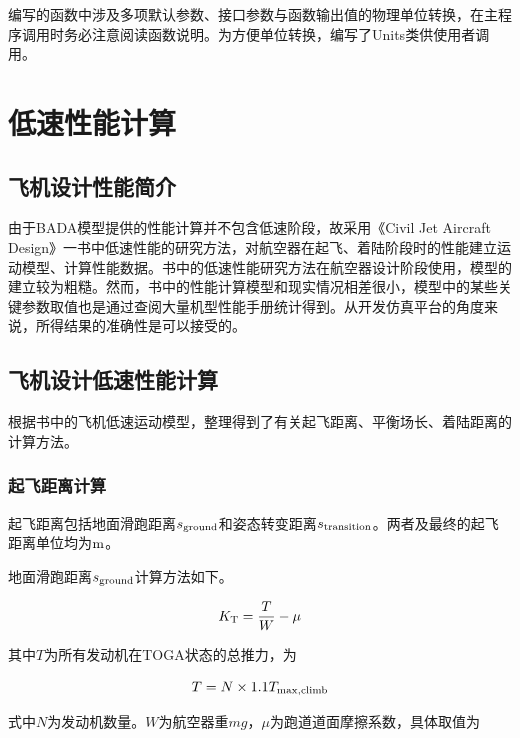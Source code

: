 \documentclass[a4paper,punct,space,heading=true,AutoFakeBold]{ctexrep}
\begin{document}
编写的函数中涉及多项默认参数、接口参数与函数输出值的物理单位转换，在主程序调用时务必注意阅读函数说明。为方便单位转换，编写了Units类供使用者调用。





\chapter{低速性能计算}\label{lowspeedperformance}

\section{飞机设计性能简介}

由于BADA模型提供的性能计算并不包含低速阶段，故采用《Civil Jet Aircraft Design》一书中低速性能的研究方法\cite{AircraftDesign}，对航空器在起飞、着陆阶段时的性能建立运动模型、计算性能数据。书中的低速性能研究方法在航空器设计阶段使用，模型的建立较为粗糙。然而，书中的性能计算模型和现实情况相差很小，模型中的某些关键参数取值也是通过查阅大量机型性能手册统计得到。从开发仿真平台的角度来说，所得结果的准确性是可以接受的。

\section{飞机设计低速性能计算}

根据书中的飞机低速运动模型，整理得到了有关起飞距离、平衡场长、着陆距离的计算方法。


\subsection{起飞距离计算}\label{TOdistance}

起飞距离包括地面滑跑距离$s_{\rm ground}$和姿态转变距离$s_{\rm transition}$。两者及最终的起飞距离单位均为$\rm m$。

地面滑跑距离$s_{\rm ground}$计算方法如下。

\begin{equation}
K_{\rm T}=\frac{T}{W}-\mu
\end{equation}

其中$T$为所有发动机在TOGA状态的总推力，为

\begin{equation}
T=N\times 1.1T_{\rm max,climb}
\end{equation}

式中$N$为发动机数量。$W$为航空器重$mg$，$\mu$为跑道道面摩擦系数，具体取值为
\end{document}
